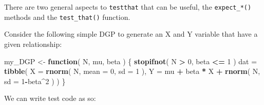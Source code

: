 \documentclass[
]{book}
\newenvironment{Shaded}{\begin{snugshade}}{\end{snugshade}}
\newcommand{\AttributeTok}[1]{\textcolor[rgb]{0.13,0.29,0.53}{#1}}
\newcommand{\ControlFlowTok}[1]{\textcolor[rgb]{0.13,0.29,0.53}{\textbf{#1}}}
\newcommand{\DecValTok}[1]{\textcolor[rgb]{0.00,0.00,0.81}{#1}}
\newcommand{\FunctionTok}[1]{\textcolor[rgb]{0.13,0.29,0.53}{\textbf{#1}}}
\newcommand{\NormalTok}[1]{#1}
\newcommand{\OtherTok}[1]{\textcolor[rgb]{0.56,0.35,0.01}{#1}}
\newcommand{\SpecialCharTok}[1]{\textcolor[rgb]{0.81,0.36,0.00}{\textbf{#1}}}
\begin{document}
There are two general aspects to \texttt{testthat} that can be useful, the \texttt{expect\_*()} methods and the \texttt{test\_that()} function.

Consider the following simple DGP to generate an X and Y variable that have a given relationship:

\begin{Shaded}
\begin{Highlighting}[]
\NormalTok{my\_DGP }\OtherTok{\textless{}{-}} \ControlFlowTok{function}\NormalTok{( N, mu, beta ) \{}
  \FunctionTok{stopifnot}\NormalTok{( N }\SpecialCharTok{\textgreater{}} \DecValTok{0}\NormalTok{, beta }\SpecialCharTok{\textless{}=} \DecValTok{1}\NormalTok{ )}
\NormalTok{  dat }\OtherTok{=} \FunctionTok{tibble}\NormalTok{( }\AttributeTok{X =} \FunctionTok{rnorm}\NormalTok{( N, }\AttributeTok{mean =} \DecValTok{0}\NormalTok{, }\AttributeTok{sd =} \DecValTok{1}\NormalTok{ ),}
                \AttributeTok{Y =}\NormalTok{ mu }\SpecialCharTok{+}\NormalTok{ beta }\SpecialCharTok{*}\NormalTok{ X }\SpecialCharTok{+} \FunctionTok{rnorm}\NormalTok{( N, }\AttributeTok{sd =} \DecValTok{1}\SpecialCharTok{{-}}\NormalTok{beta}\SpecialCharTok{\^{}}\DecValTok{2}\NormalTok{ ) )}
\NormalTok{\}}
\end{Highlighting}
\end{Shaded}

We can write test code as so:
\end{document}
